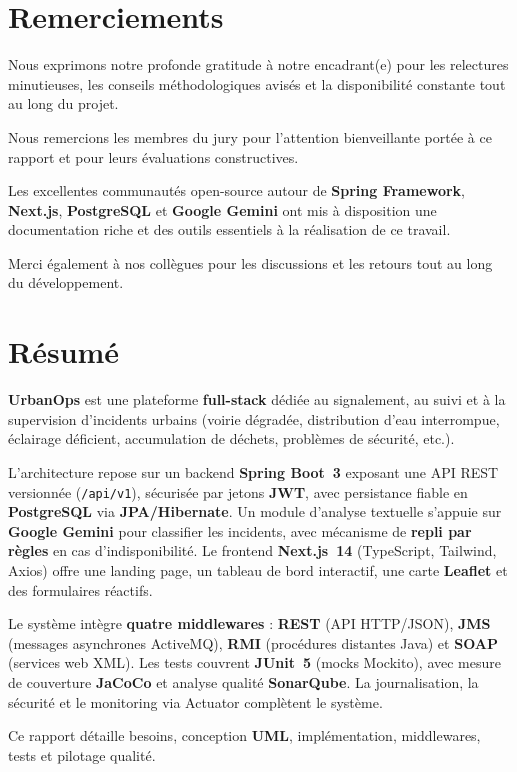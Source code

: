 \documentclass[12pt,a4paper,twoside,openright]{book}
\begin{document}
\chapter*{Remerciements}
\begin{center}
\begin{minipage}{0.88\textwidth}
\justifying
Nous exprimons notre profonde gratitude à notre encadrant(e) pour les relectures minutieuses, les conseils méthodologiques avisés et la disponibilité constante tout au long du projet.

Nous remercions les membres du jury pour l'attention bienveillante portée à ce rapport et pour leurs évaluations constructives.

Les excellentes communautés open-source autour de \textbf{Spring Framework}, \textbf{Next.js}, \textbf{PostgreSQL} et \textbf{Google Gemini} ont mis à disposition une documentation riche et des outils essentiels à la réalisation de ce travail.

Merci également à nos collègues pour les discussions et les retours tout au long du développement.
\end{minipage}
\end{center}
\cleardoublepage

\chapter*{Résumé}
\thispagestyle{plain}
\begin{resumebox}
\justifying
\textbf{UrbanOps} est une plateforme \textbf{full-stack} dédiée au signalement, au suivi et à la supervision d'incidents urbains (voirie dégradée, distribution d'eau interrompue, éclairage déficient, accumulation de déchets, problèmes de sécurité, etc.).

L'architecture repose sur un backend \textbf{Spring Boot~3} exposant une API REST versionnée (\texttt{/api/v1}), sécurisée par jetons \textbf{JWT}, avec persistance fiable en \textbf{PostgreSQL} via \textbf{JPA/Hibernate}. Un module d'analyse textuelle s'appuie sur \textbf{Google Gemini} pour classifier les incidents, avec mécanisme de \textbf{repli par règles} en cas d'indisponibilité. Le frontend \textbf{Next.js~14} (TypeScript, Tailwind, Axios) offre une landing page, un tableau de bord interactif, une carte \textbf{Leaflet} et des formulaires réactifs.

Le système intègre \textbf{quatre middlewares} : \textbf{REST} (API HTTP/JSON), \textbf{JMS} (messages asynchrones ActiveMQ), \textbf{RMI} (procédures distantes Java) et \textbf{SOAP} (services web XML). Les tests couvrent \textbf{JUnit~5} (mocks Mockito), avec mesure de couverture \textbf{JaCoCo} et analyse qualité \textbf{SonarQube}. La journalisation, la sécurité et le monitoring via Actuator complètent le système.

Ce rapport détaille besoins, conception \textbf{UML}, implémentation, middlewares, tests et pilotage qualité.
\end{resumebox}
\end{document}
